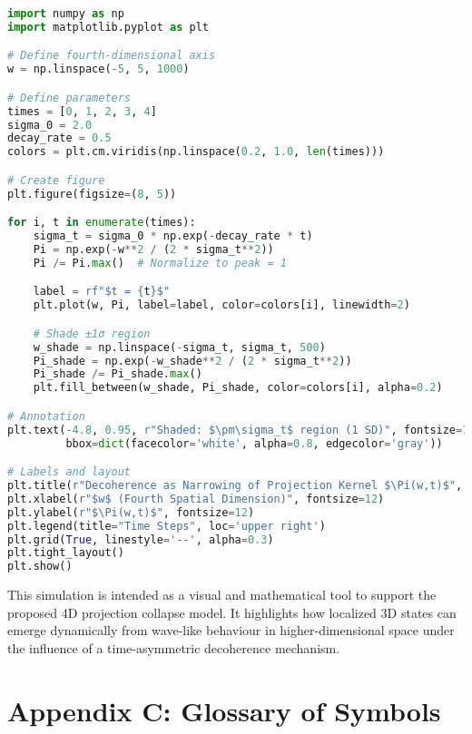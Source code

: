 \documentclass[12pt]{article}
\begin{document}
\begin{lstlisting}[language=Python, caption={Simulation of Decoherence-Induced Projection Kernel Narrowing}, label={lst:projection_kernel}]
import numpy as np
import matplotlib.pyplot as plt

# Define fourth-dimensional axis
w = np.linspace(-5, 5, 1000)

# Define parameters
times = [0, 1, 2, 3, 4]
sigma_0 = 2.0
decay_rate = 0.5
colors = plt.cm.viridis(np.linspace(0.2, 1.0, len(times)))

# Create figure
plt.figure(figsize=(8, 5))

for i, t in enumerate(times):
    sigma_t = sigma_0 * np.exp(-decay_rate * t)
    Pi = np.exp(-w**2 / (2 * sigma_t**2))
    Pi /= Pi.max()  # Normalize to peak = 1

    label = rf"$t = {t}$"
    plt.plot(w, Pi, label=label, color=colors[i], linewidth=2)

    # Shade ±1σ region
    w_shade = np.linspace(-sigma_t, sigma_t, 500)
    Pi_shade = np.exp(-w_shade**2 / (2 * sigma_t**2))
    Pi_shade /= Pi_shade.max()
    plt.fill_between(w_shade, Pi_shade, color=colors[i], alpha=0.2)

# Annotation
plt.text(-4.8, 0.95, r"Shaded: $\pm\sigma_t$ region (1 SD)", fontsize=10,
         bbox=dict(facecolor='white', alpha=0.8, edgecolor='gray'))

# Labels and layout
plt.title(r"Decoherence as Narrowing of Projection Kernel $\Pi(w,t)$", fontsize=13)
plt.xlabel(r"$w$ (Fourth Spatial Dimension)", fontsize=12)
plt.ylabel(r"$\Pi(w,t)$", fontsize=12)
plt.legend(title="Time Steps", loc='upper right')
plt.grid(True, linestyle='--', alpha=0.3)
plt.tight_layout()
plt.show()
\end{lstlisting}

\vspace{1em}

\noindent
This simulation is intended as a visual and mathematical tool to support the proposed 4D projection collapse model. It highlights how localized 3D states can emerge dynamically from wave-like behaviour in higher-dimensional space under the influence of a time-asymmetric decoherence mechanism.

\newpage

\section*{Appendix C: Glossary of Symbols}
\end{document}
